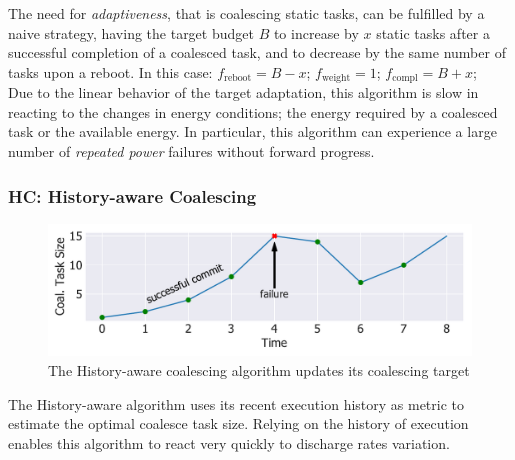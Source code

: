 The need for \emph{adaptiveness}, that is coalescing static tasks, can be fulfilled by a naive strategy, having the target budget $B$ to increase by $x$ static tasks after a successful completion of a coalesced task, and to decrease by the same number of tasks upon a reboot. In this case: $f_\text{reboot} = B - x$; $f_\text{weight} =  1$; $f_\text{compl} = B + x$; \\
Due to the linear behavior of the target adaptation, this algorithm is slow in reacting to the changes in energy conditions; the energy required by a coalesced task or the available energy. In particular, this algorithm can experience a large number of \emph{repeated power} failures without forward progress.

\subsubsection{HC: History-aware Coalescing}
\label{subsec:hCCoalescing}

\begin{figure}
	\centering
	\includegraphics[width=\columnwidth]{figures/HCCoal}%
	\caption{The History-aware coalescing algorithm  updates its coalescing target}
	\label{fig:HCCoal}
\end{figure}

The History-aware algorithm uses its recent execution history as metric to estimate the optimal coalesce task size. Relying on the history of execution enables this algorithm to react very quickly to discharge rates variation. 
